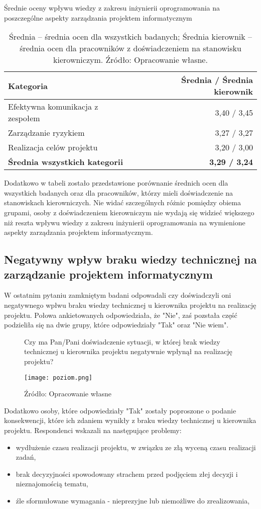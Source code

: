 \begin{table}[h]
\centering
\caption{Średnie oceny wpływu wiedzy z zakresu inżynierii oprogramowania na poszczególne aspekty zarządzania projektem informatycznym}
\begin{tabular}{p{8cm} r}
\toprule
\textbf{Kategoria} & \textbf{Średnia / Średnia kierownik} \\
\midrule
Efektywna komunikacja z zespołem & 3{,}40 / 3{,}45 \\
Zarządzanie ryzykiem & 3{,}27 / 3{,}27 \\
Realizacja celów projektu & 3{,}20 / 3{,}00 \\
\textbf{Średnia wszystkich kategorii} & \textbf{3{,}29 / 3{,}24} \\  
\bottomrule
\end{tabular}
\caption*{Średnia – średnia ocen dla wszystkich badanych; Średnia kierownik – średnia ocen dla pracowników z doświadczeniem na stanowisku kierowniczym. Źródło: Opracowanie własne.}
\end{table}

Dodatkowo w tabeli zostało przedstawione porównanie średnich ocen dla wszystkich badanych oraz dla pracowników, którzy mieli doświadczenie na stanowiskach kierowniczych. Nie widać szczególnych różnic pomiędzy obiema grupami, osoby z doświadczeniem kierowniczym nie wydają się widzieć większego niż reszta wpływu wiedzy z zakresu inżynierii oprogramowania na wymienione aspekty zarządzania projektem informatycznym. 

\subsection{Negatywny wpływ braku wiedzy technicznej na zarządzanie projektem informatycznym}
W ostatnim pytaniu zamkniętym badani odpowadali czy doświadczyli oni negatywnego wpłwu braku wiedzy technicznej u kierownika projektu na realizację projektu. Połowa ankietowanych odpowiedziała, że "Nie", zaś pozstała część podzieliła się na dwie grupy, które odpowiedziały "Tak" oraz "Nie wiem". 

\begin{figure}
  \caption{Czy ma Pan/Pani doświadczenie sytuacji, w której brak wiedzy technicznej u kierownika projektu negatywnie wpłynął na realizację projektu?}
  \centering
  \texttt{[image: poziom.png]}
  \caption*{Źródło: Opracowanie własne}
\end{figure}

Dodatkowo osoby, które odpowiedziały "Tak" zostały poproszone o podanie konsekwencji, które ich zdaniem wynikły z braku wiedzy technicznej u kierownika projektu. Respondenci wskazali na następujące problemy:
\begin{itemize}
  \item wydłużenie czasu realizacji projektu, w związku ze złą wyceną czasu realizacji zadań,
  \item brak decyzyjności spowodowany strachem przed podjęciem złej decyzji i nieznajomością tematu,
  \item źle sformułowane wymagania - nieprezyjne lub niemożliwe do zrealizowania,
\end{itemize}

